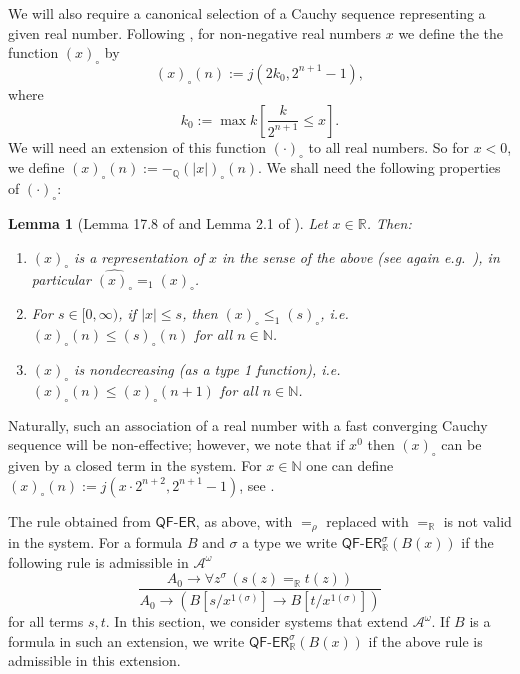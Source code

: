 \documentclass[11pt]{amsart}
\newtheorem{lemma}[theorem]{Lemma}
\theoremstyle{definition}
\theoremstyle{remark}
\def\NN{\mathbb{N}}
\def\RR{\mathbb{R}}
\newcommand{\QFER}{\textsf{QF}\mbox{-}\textsf{ER}}
\begin{document}
We will also require a canonical selection of a Cauchy sequence representing a given real number. Following \cite[Defintion 17.7]{Kohlenbach2008}, for non-negative real numbers $x$ we define the the function $(x)_\circ$ by
\[
(x)_\circ(n):=j(2k_0,2^{n+1}-1),\label{def:circDef}
\]
where
\[
k_0:=\max k\left[\frac{k}{2^{n+1}}\leq x\right].
\]
We will need an extension of this function $(\cdot)_\circ$ to all real numbers. So for $x<0$, we define  $(x)_\circ(n):=-_\mathbb{Q}(\vert x\vert)_\circ(n)$. We shall need the following properties of $(\cdot)_\circ$:

\begin{lemma}[Lemma 17.8 of \cite{Kohlenbach2008} and Lemma 2.1 of \cite{Pis2023} ]
\label{lem:circprop}
Let $x\in\mathbb{R}$. Then:
\begin{enumerate}
\item $(x)_\circ$ is a representation of $x$ in the sense of the above (see again e.g.\ \cite{Kohlenbach2008}), in particular $\widehat{(x)_\circ}=_1 (x)_\circ$.
\item For $s\in [0,\infty)$, if $\vert x\vert \leq s$, then $(x)_\circ\leq_1 (s)_\circ$, i.e.\ $(x)_\circ(n)\leq (s)_\circ(n)$ for all $n\in\mathbb{N}$.
\item $(x)_\circ$ is nondecreasing (as a type 1 function), i.e.\  $(x)_\circ(n)\leq (x)_\circ(n+1)$ for all $n\in\mathbb{N}$.
\end{enumerate} 
\end{lemma}

Naturally, such an association of a real number with a fast converging Cauchy sequence will be non-effective; however, we note that if $x^0$ then $(x)_\circ$ can be given by a closed term in the system. For $x\in \NN$ one can define $(x)_\circ(n):= j(x\cdot 2^{n+2},2^{n+1}-1)$, see \cite[p.426 and p.383]{Kohlenbach2008}.

The rule obtained from $\QFER$, as above, with  $=_\rho$ replaced with $=_\RR$ is not valid in the system. For a formula $B$ and $\sigma$ a type we write $\QFER^\sigma_\RR(B(x))$ if the following rule is admissible in $\mathcal{A}^\omega$
\[
  \frac{A_0 \to \forall z^\sigma\,( s(z) =_\RR t(z))}{A_0 \to (B[s/x^{1(\sigma)}] \to B[t/x^{1(\sigma)}])}
\]
for all terms $s,t$.  In this section, we consider systems that extend $\mathcal{A}^\omega$. If $B$ is a formula in such an extension, we write $\QFER^\sigma_\RR(B(x))$ if the above rule is admissible in this extension.
\end{document}
